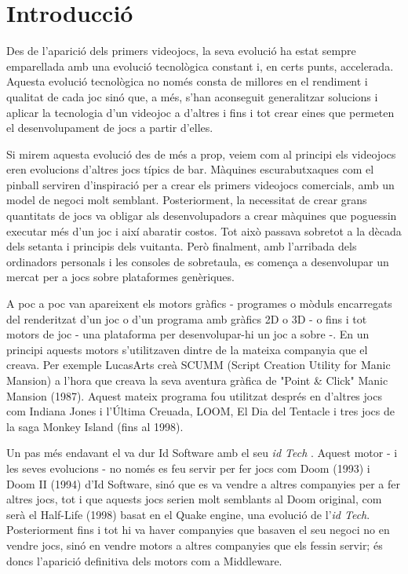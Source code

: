 \chapter{Introducció}

\pagestyle{headings}
\setcounter{page}{1}

Des de l'aparició dels primers videojocs, la seva evolució ha estat sempre emparellada amb una evolució tecnològica constant i, en certs punts, accelerada. Aquesta evolució tecnològica no només consta de millores en el rendiment i qualitat de cada joc sinó que, a més, s’han aconseguit generalitzar solucions i aplicar la tecnologia d’un videojoc a d'altres i fins i tot crear eines que permeten el desenvolupament de jocs a partir d'elles.

Si mirem aquesta evolució des de més a prop, veiem com al principi els videojocs eren evolucions d'altres jocs típics de bar. Màquines escurabutxaques com el pinball serviren d'inspiració per a crear els primers videojocs comercials, amb un model de negoci molt semblant. Posteriorment, la necessitat de crear grans quantitats de jocs va obligar als desenvolupadors a crear màquines que poguessin executar més d'un joc i així abaratir costos. Tot això passava sobretot a la dècada dels setanta i principis dels vuitanta. Però finalment, amb l'arribada dels ordinadors personals i les consoles de sobretaula, es comença a desenvolupar un mercat per a jocs sobre plataformes genèriques.

A poc a poc van apareixent els motors gràfics - programes o mòduls encarregats del renderitzat d'un joc o d'un programa amb gràfics 2D o 3D - o fins i tot motors de joc - una plataforma per desenvolupar-hi un joc a sobre -. En un principi aquests motors s'utilitzaven dintre de la mateixa companyia que el creava. Per exemple LucasArts creà {SCUMM} ({Script Creation Utility for Manic Mansion}) \citep{WikiScumm} a l'hora que creava la seva aventura gràfica de "Point \& Click" Manic Mansion (1987). Aquest mateix programa fou utilitzat després en d'altres jocs com Indiana Jones i l'Última Creuada, LOOM, El Dia del Tentacle i tres jocs de la saga Monkey Island (fins al 1998).

Un pas més endavant el va dur Id Software amb el seu {\em id Tech}  \citep{WikiIdTech}. Aquest motor - i les seves evolucions - no només es feu servir per fer jocs com Doom (1993) i Doom II (1994) d'Id Software, sinó que es va vendre a altres companyies per a fer altres jocs, tot i que aquests jocs serien molt semblants al Doom original, com serà el Half-Life (1998) basat en el Quake engine, una evolució de l'{\em id Tech}. Posteriorment fins i tot hi va haver companyies que basaven el seu negoci no en vendre jocs, sinó en vendre motors a altres companyies que els fessin servir; és doncs l'aparició definitiva dels motors com a Middleware.


